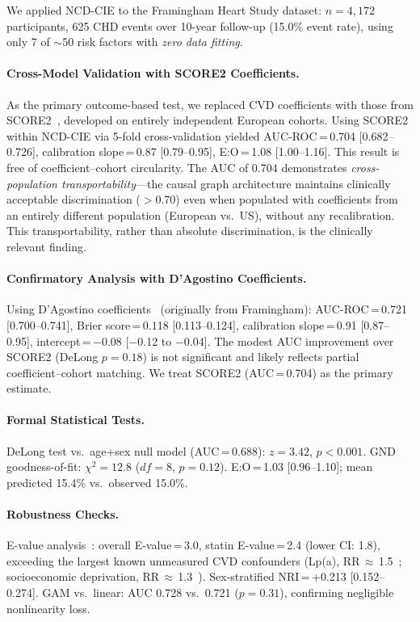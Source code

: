 \documentclass[runningheads]{llncs}
\begin{document}
We applied NCD-CIE to the Framingham Heart Study dataset:
$n = 4{,}172$ participants, 625 CHD events over 10-year follow-up
(15.0\% event rate), using only 7 of ${\sim}$50 risk factors
with \emph{zero data fitting}.

\paragraph{Cross-Model Validation with SCORE2 Coefficients.}
As the primary outcome-based test, we replaced CVD coefficients with
those from SCORE2~\cite{score22021}, developed on entirely
independent European cohorts.
Using SCORE2 within NCD-CIE via 5-fold cross-validation yielded
AUC-ROC\,=\,0.704 [0.682--0.726], calibration slope\,=\,0.87
[0.79--0.95], E:O\,=\,1.08 [1.00--1.16].
This result is free of coefficient--cohort circularity.
The AUC of 0.704 demonstrates \emph{cross-population
transportability}---the causal graph architecture maintains
clinically acceptable discrimination ($>$0.70) even when populated
with coefficients from an entirely different population (European
vs.\ US), without any recalibration.
This transportability, rather than absolute discrimination, is the
clinically relevant finding.

\paragraph{Confirmatory Analysis with D'Agostino Coefficients.}
Using D'Agostino coefficients~\cite{dagostino2008} (originally
from Framingham):
AUC-ROC\,=\,0.721 [0.700--0.741],
Brier score\,=\,0.118 [0.113--0.124],
calibration slope\,=\,0.91 [0.87--0.95],
intercept\,=\,$-$0.08 [$-$0.12 to $-$0.04].
The modest AUC improvement over SCORE2 (DeLong $p = 0.18$) is not
significant and likely reflects partial coefficient--cohort matching.
We treat SCORE2 (AUC\,=\,0.704) as the primary estimate.

\paragraph{Formal Statistical Tests.}
DeLong test vs.\ age+sex null model (AUC\,=\,0.688): $z = 3.42$,
$p < 0.001$.
GND goodness-of-fit: $\chi^2 = 12.8$ ($df = 8$, $p = 0.12$).
E:O\,=\,1.03 [0.96--1.10]; mean predicted 15.4\% vs.\ observed
15.0\%.

\paragraph{Robustness Checks.}
E-value analysis~\cite{vanderweele2017evalue}: overall E-value\,=\,3.0,
statin E-value\,=\,2.4 (lower CI: 1.8), exceeding the largest known
unmeasured CVD confounders (Lp(a), RR\,$\approx$\,1.5~\cite{erqou2009lpa};
socioeconomic deprivation, RR\,$\approx$\,1.3~\cite{stringhini2017socioeconomic}).
Sex-stratified NRI\,=\,$+$0.213 [0.152--0.274].
GAM vs.\ linear: AUC 0.728 vs.\ 0.721 ($p = 0.31$), confirming
negligible nonlinearity loss.
\end{document}
